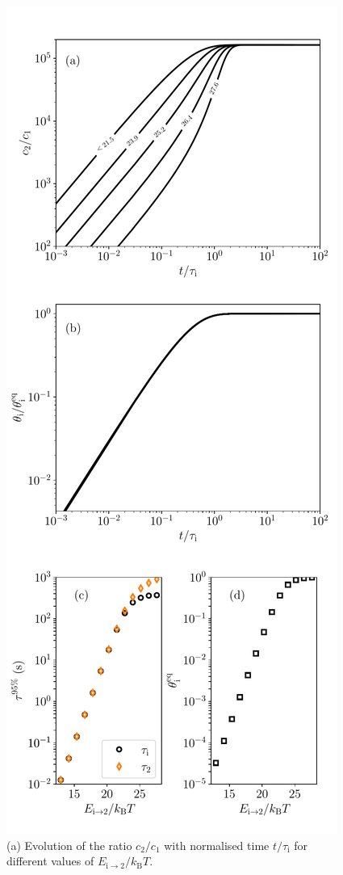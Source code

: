 \begin{figure} [h!]
    \centering
    \includegraphics[width=0.8\linewidth]{Figures/appendix/kinetic_interface.pdf}
    \caption{(a) Evolution of the ratio $c_2/c_1$ with normalised time $t/\tau_\mathrm{i}$ for different values of $E_\mathrm{i \rightarrow 2}/k_\mathrm{B}T$.
}
\end{figure}
